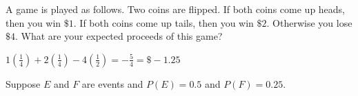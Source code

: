 \documentclass[answers,addpoints,12pt]{exam}
\begin{document}
\begin{questions}
\question[10] A game is played as follows.
Two coins are flipped. If both coins come up
heads, then you win $\$1$. If both coins come
up tails, then you win $\$2$. 
Otherwise you lose $\$4$. What are your expected proceeds
of this game?
\begin{solution}
$1\left(\frac{1}{4}\right)+2\left(\frac{1}{4}\right)
-4\left(\frac{1}{2}\right)=-\frac{5}{4}=\$-1.25$
\end{solution}

\question[15] Suppose $E$ and $F$ are events
and $P\left(E\right)=0.5$ and $P\left(F\right)=0.25$.
\begin{solution}
\end{solution}

\end{questions}

\vfill
\begin{center}\gradetable[h][questions]\end{center}
\end{document}
